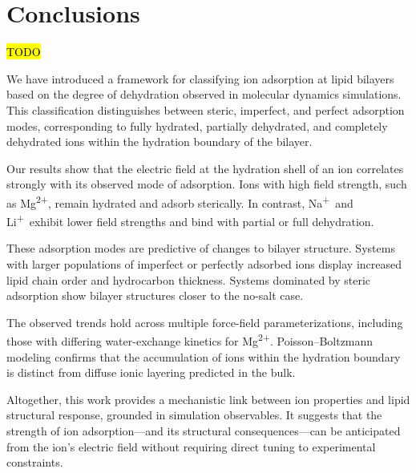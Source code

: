 \documentclass[12pt,openany,final]{book}
\newcommand{\na}{Na\textsuperscript{+}}
\newcommand{\li}{Li\textsuperscript{+}}
\newcommand{\mg}{Mg\textsuperscript{2+}}
\newcommand{\TODO}{\hl{TODO}~}
\begin{document}
\chapter{Conclusions}
\TODO{
We have introduced a framework for classifying ion adsorption at lipid bilayers based on the degree of dehydration observed in molecular dynamics simulations. This classification distinguishes between steric, imperfect, and perfect adsorption modes, corresponding to fully hydrated, partially dehydrated, and completely dehydrated ions within the hydration boundary of the bilayer.

Our results show that the electric field at the hydration shell of an ion correlates strongly with its observed mode of adsorption. Ions with high field strength, such as \mg, remain hydrated and adsorb sterically. In contrast, \na\ and \li\ exhibit lower field strengths and bind with partial or full dehydration.

These adsorption modes are predictive of changes to bilayer structure. Systems with larger populations of imperfect or perfectly adsorbed ions display increased lipid chain order and hydrocarbon thickness. Systems dominated by steric adsorption show bilayer structures closer to the no-salt case.

The observed trends hold across multiple force-field parameterizations, including those with differing water-exchange kinetics for \mg. Poisson--Boltzmann modeling confirms that the accumulation of ions within the hydration boundary is distinct from diffuse ionic layering predicted in the bulk.

Altogether, this work provides a mechanistic link between ion properties and lipid structural response, grounded in simulation observables. It suggests that the strength of ion adsorption---and its structural consequences---can be anticipated from the ion's electric field without requiring direct tuning to experimental constraints.
}

\end{document}
